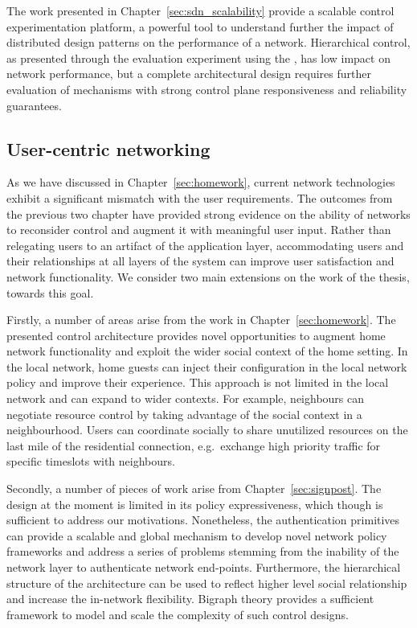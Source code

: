 The work presented in Chapter~\ref{sec:sdn_scalability} provide a scalable
control experimentation platform, a powerful tool to understand further the
impact of  distributed design patterns on the performance of a network.
Hierarchical control, as presented through the evaluation experiment using the
\sdnsim, has low impact on network performance, but a complete architectural
design requires further evaluation of mechanisms with strong control plane
responsiveness and reliability guarantees. 

\subsection{User-centric networking}

As we have discussed in Chapter~\ref{sec:homework}, current network technologies
exhibit a significant mismatch with the user requirements. The outcomes from the
previous two chapter have provided strong evidence on the ability of networks to
reconsider control and augment it with meaningful user input. Rather than
relegating users to an artifact of the application layer, accommodating users
and their relationships at all layers of the system can improve user
satisfaction and network functionality. We consider two main extensions on the
work of the thesis, towards this goal. 

Firstly, a number of areas arise from the work in Chapter~\ref{sec:homework}.
The presented control architecture provides novel opportunities to augment home
network functionality and exploit the wider social context of the home setting.
In the local network, home guests can inject their configuration in the local
network policy and improve their experience. This approach is not limited in
the local network and can expand to wider contexts. For example, neighbours can
negotiate  resource control by taking advantage of the social context in a
neighbourhood. Users can coordinate socially to share unutilized resources on
the last mile of the residential connection,  e.g.~exchange high priority
traffic for specific timeslots with neighbours.

Secondly, a number of pieces of work arise from Chapter~\ref{sec:signpost}.  The
\signpost design at the moment is limited in its policy expressiveness, which
though is sufficient to address our motivations.  Nonetheless, the
authentication primitives can provide a scalable and global mechanism to develop
novel network policy frameworks and address a series of problems stemming from
the inability of the network layer to authenticate network end-points.
Furthermore, the hierarchical structure of the \signpost architecture can be
used to reflect higher level social relationship and increase the in-network
flexibility. Bigraph theory provides a sufficient framework to model and scale
the complexity of such control designs. 

